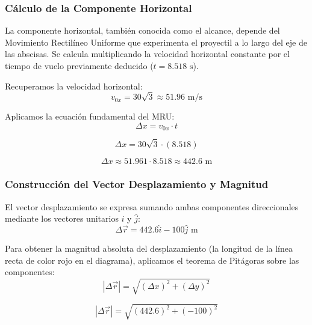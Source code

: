 \documentclass[12pt, a4paper]{article}
\begin{document}
\subsubsection*{Cálculo de la Componente Horizontal}

La componente horizontal, también conocida como el alcance, depende del Movimiento Rectilíneo Uniforme que experimenta el proyectil a lo largo del eje de las abscisas. Se calcula multiplicando la velocidad horizontal constante por el tiempo de vuelo previamente deducido ($t = 8.518 \text{ s}$).

Recuperamos la velocidad horizontal:
\begin{equation}
v_{0x} = 30\sqrt{3} \approx 51.96 \text{ m/s}
\end{equation}

Aplicamos la ecuación fundamental del MRU:
\begin{equation}
\Delta x = v_{0x} \cdot t
\end{equation}

\begin{equation}
\Delta x = 30\sqrt{3} \cdot (8.518)
\end{equation}

\begin{equation}
\Delta x \approx 51.961 \cdot 8.518 \approx 442.6 \text{ m}
\end{equation}

\subsubsection*{Construcción del Vector Desplazamiento y Magnitud}

El vector desplazamiento se expresa sumando ambas componentes direccionales mediante los vectores unitarios $\hat{i}$ y $\hat{j}$:
\begin{equation}
\Delta\vec{r} = 442.6\hat{i} - 100\hat{j} \text{ m}
\end{equation}

Para obtener la magnitud absoluta del desplazamiento (la longitud de la línea recta de color rojo en el diagrama), aplicamos el teorema de Pitágoras sobre las componentes:
\begin{equation}
|\Delta\vec{r}| = \sqrt{(\Delta x)^2 + (\Delta y)^2}
\end{equation}

\begin{equation}
|\Delta\vec{r}| = \sqrt{(442.6)^2 + (-100)^2}
\end{equation}
\end{document}
